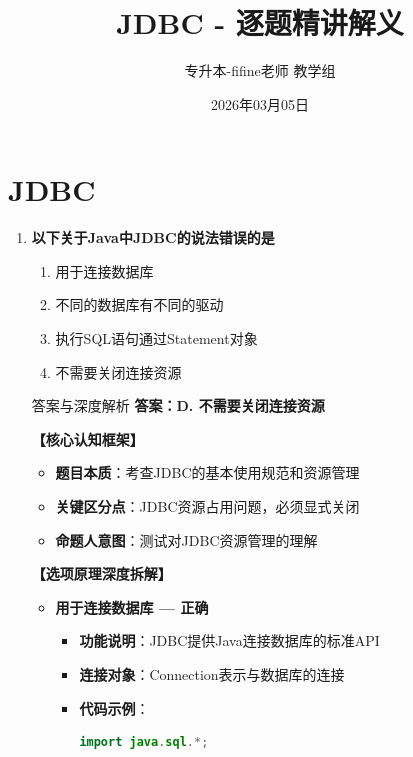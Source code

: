 \documentclass[12pt, a4paper]{ctexart}
\title{\textcolor{myblue}{\textbf{JDBC - 逐题精讲解义}}}
\author{专升本-fifine老师 教学组}
\date{2026年03月05日}
\begin{document}
\maketitle
\thispagestyle{empty}
\newpage

\section{JDBC}

\begin{enumerate}[label=\textbf{\arabic*.}]

	\item \textbf{以下关于Java中JDBC的说法错误的是}
	      \begin{enumerate}[label=\Alph*.]
		      \item 用于连接数据库
		      \item 不同的数据库有不同的驱动
		      \item 执行SQL语句通过Statement对象
		      \item 不需要关闭连接资源
	      \end{enumerate}

	      \begin{bluebox}{答案与深度解析}
		      \textbf{答案：D. 不需要关闭连接资源}

		      \textbf{【核心认知框架】}
		      \begin{itemize}[label={}, leftmargin=*, nosep]
			      \item \textbf{题目本质}：考查JDBC的基本使用规范和资源管理
			      \item \textbf{关键区分点}：JDBC资源占用问题，必须显式关闭
			      \item \textbf{命题人意图}：测试对JDBC资源管理的理解
		      \end{itemize}

		      \textbf{【选项原理深度拆解】}

		      \begin{itemize}[leftmargin=*, nosep, label={}]
			      \item[A] \textbf{用于连接数据库 — 正确}
			            \begin{itemize}[label={}, leftmargin=*, nosep]
				            \item \textbf{功能说明}：JDBC提供Java连接数据库的标准API
				            \item \textbf{连接对象}：Connection表示与数据库的连接
				            \item \textbf{代码示例}：
				                  \begin{lstlisting}[language=Java]
import java.sql.*;


\end{lstlisting}
\end{itemize}
\end{itemize}
\end{bluebox}
\end{enumerate}
\end{document}
